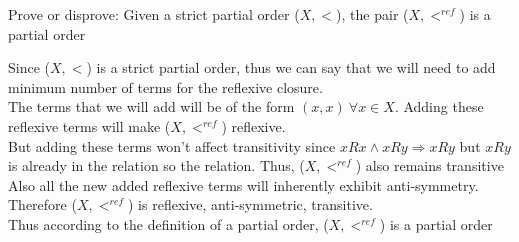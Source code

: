 \documentclass[12pt]{article}
\newenvironment{solution}[2][Solution]{ \begin{trivlist}
\item[\hskip \labelsep {\bfseries #1}]}{\end{trivlist}}
\newenvironment{problem}[2][Problem]{\begin{trivlist}
\item[\hskip \labelsep {\bfseries #1}\hskip \labelsep {\bfseries #2.}]}{\end{trivlist}}
\begin{document}
\vskip 0.5in

\begin{problem}{6}Prove or disprove: Given a strict partial order ($X,<$), the pair ($X,<^{ref}$) is a partial order

\end{problem}
\begin{solution}{6}
Since ($X,<$) is a strict partial order, thus we can say that we will need to add minimum number of terms for the reflexive closure.\\ The terms that we will add will be of the form $(x,x)\ \forall x \in X$.
Adding these reflexive terms will make ($X,<^{ref}$) reflexive. \\
But adding these terms won't affect transitivity since $xRx \wedge xRy \Rightarrow xRy$ but $xRy$ is already in the relation so the relation. Thus, ($X,<^{ref}$) also remains transitive
\\
Also all the new added reflexive terms will inherently exhibit anti-symmetry. 
\\
Therefore ($X,<^{ref}$) is reflexive, anti-symmetric, transitive.
\\
Thus according to the definition of a partial order,  ($X,<^{ref}$) is a partial order
\end{solution}

\pagebreak
\end{document}
